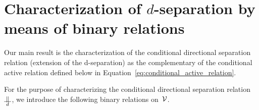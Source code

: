 \documentclass[12pt]{article}
\begin{document}
{{{%


\section{Characterization  of $d$-separation by means of binary relations}
\label{Characterization__of_the_conditional_directional_separation_binary_relation}

Our main result is the characterization of the conditional directional
separation relation (extension of the d-separation)
as the complementary of the conditional active relation defined below in
Equation~\eqref{eq:conditional_active_relation}.

For the purpose of characterizing the conditional directional separation relation~\(
\ConditionalDirectionalSeparation \), we introduce the following binary relations on~${\cal V}$.

}}}
\end{document}
